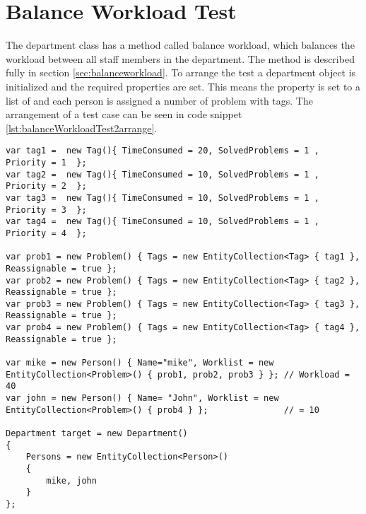 \chapter{Balance Workload Test}
\label{sec:balWorUniTes}

The department class has a method called balance workload, which balances the workload between all staff members in the department. 
The method is described fully in section \ref{sec:balanceworkload}. 
To arrange the test a department object is initialized and the required properties are set. This means the  property is set to a list of  and each person is assigned a number of problem with tags. 
The arrangement of a test case can be seen in code snippet \ref{lst:balanceWorkloadTest2arrange}. 

\begin{lstlisting}[style=sourceCode, caption=\myCaption{The arrange phase of the unit test of balance workload}, label=lst:balanceWorkloadTest2arrange,name=src:balance]
var tag1 =  new Tag(){ TimeConsumed = 20, SolvedProblems = 1 , Priority = 1  };  
var tag2 =  new Tag(){ TimeConsumed = 10, SolvedProblems = 1 , Priority = 2  }; 
var tag3 =  new Tag(){ TimeConsumed = 10, SolvedProblems = 1 , Priority = 3  }; 
var tag4 =  new Tag(){ TimeConsumed = 10, SolvedProblems = 1 , Priority = 4  }; 

var prob1 = new Problem() { Tags = new EntityCollection<Tag> { tag1 }, Reassignable = true };
var prob2 = new Problem() { Tags = new EntityCollection<Tag> { tag2 }, Reassignable = true };
var prob3 = new Problem() { Tags = new EntityCollection<Tag> { tag3 }, Reassignable = true };
var prob4 = new Problem() { Tags = new EntityCollection<Tag> { tag4 }, Reassignable = true };
   
var mike = new Person() { Name="mike", Worklist = new EntityCollection<Problem>() { prob1, prob2, prob3 } }; // Workload = 40
var john = new Person() { Name= "John", Worklist = new EntityCollection<Problem>() { prob4 } };               // = 10

Department target = new Department()
{
    Persons = new EntityCollection<Person>()
    {
        mike, john
    }
};
\end{lstlisting}

